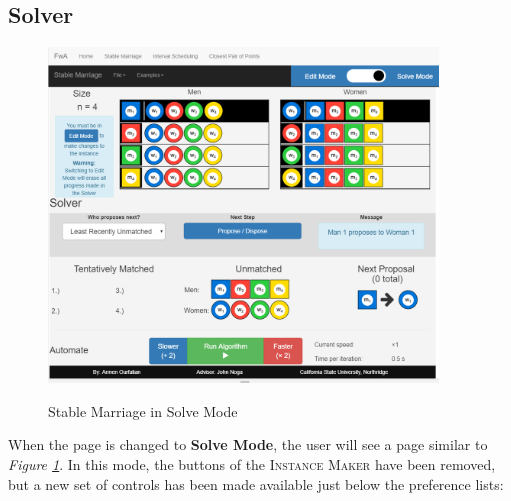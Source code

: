 \subsection{Solver}
\begin{figure}[H]
  \caption{Stable Marriage in Solve Mode}
  \includegraphics[height=3.5in]
  {images/stable-marriage/stable-marriage-solve.png}
  \label{fig-stable-marriage-solve}
  \centering
\end{figure}
\hspace{-0.3in}
When the page is changed to \textbf{Solve Mode}, the user will see a page similar to 
\textit{Figure \ref{fig-stable-marriage-solve}}. 
In this mode, the buttons of the \textsc{Instance Maker} have been removed, 
but a new set of controls has been made available just below the preference lists:
